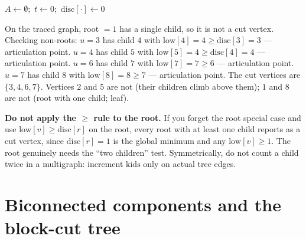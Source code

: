 \begin{algorithm}[H]
\caption{\textsc{Articulation}: list all cut vertices in one DFS}
\label{ch10:alg-artic}
$A\gets\emptyset$;\ $t\gets0$;\ $\mathrm{disc}[\cdot]\gets0$\;
\end{algorithm}

On the traced graph, root $=1$ has a single child, so it is not a cut vertex. Checking
non-roots: $u=3$ has child $4$ with $\mathrm{low}[4]=4\ge\mathrm{disc}[3]=3$ ---
articulation point. $u=4$ has child $5$ with $\mathrm{low}[5]=4\ge\mathrm{disc}[4]=4$
--- articulation point. $u=6$ has child $7$ with $\mathrm{low}[7]=7\ge6$ --- articulation
point. $u=7$ has child $8$ with $\mathrm{low}[8]=8\ge7$ --- articulation point. The cut
vertices are $\{3,4,6,7\}$. Vertices $2$ and $5$ are not (their children climb above
them); $1$ and $8$ are not (root with one child; leaf).

\begin{trapbox}
\textbf{Do not apply the $\ge$ rule to the root.} If you forget the root special case
and use $\mathrm{low}[v]\ge\mathrm{disc}[r]$ on the root, every root with at least one
child reports as a cut vertex, since $\mathrm{disc}[r]=1$ is the global minimum and any
$\mathrm{low}[v]\ge1$. The root genuinely needs the ``two children'' test.
Symmetrically, do not count a child twice in a multigraph: increment $\mathrm{kids}$
only on actual tree edges.
\end{trapbox}

\section{Biconnected components and the block-cut tree}
\label{ch10:bcc}

